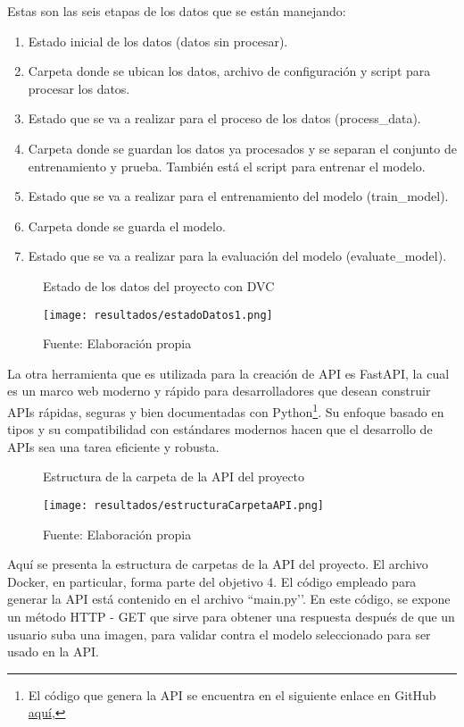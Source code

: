 Estas son las seis etapas de los datos que se están manejando:

\begin{enumerate}
	\item Estado inicial de los datos (datos sin procesar).
	\item Carpeta donde se ubican los datos, archivo de configuración y script para procesar los datos.
	\item Estado que se va a realizar para el proceso de los datos (process\_data).
	\item Carpeta donde se guardan los datos ya procesados y se separan el conjunto de entrenamiento y prueba. También está el script para entrenar el modelo.
	\item Estado que se va a realizar para el entrenamiento del modelo (train\_model).
	\item Carpeta donde se guarda el modelo.
	\item Estado que se va a realizar para la evaluación del modelo (evaluate\_model).
\end{enumerate}

\newpage

\begin{figure}[h]
\centering
\caption{Estado de los datos del proyecto con DVC}
\texttt{[image: resultados/estadoDatos1.png]}
\caption*{\footnotesize Fuente: Elaboración propia}
\label{fig:figuraEstadoDatos}
\end{figure}

\newpage

La otra herramienta que es utilizada para la creación de API es FastAPI, la cual es un marco web moderno y rápido para desarrolladores que desean construir APIs rápidas, seguras y bien documentadas con Python\footnote{El código que genera la API se encuentra en el siguiente enlace en GitHub \href{https://github.com/juferoto/mlops_project/tree/master/application/src}{aquí},}. Su enfoque basado en tipos y su compatibilidad con estándares modernos hacen que el desarrollo de APIs sea una tarea eficiente y robusta.

\begin{figure}[h]
\centering
\caption{Estructura de la carpeta de la API del proyecto}
\texttt{[image: resultados/estructuraCarpetaAPI.png]}
\caption*{\footnotesize Fuente: Elaboración propia}
\label{fig:figuraEstructuraCarpetaAPI}
\end{figure}

Aquí se presenta la estructura de carpetas de la API del proyecto. El archivo Docker, en particular, forma parte del objetivo 4. El código empleado para generar la API está contenido en el archivo ``main.py’’. En este código, se expone un método HTTP - GET que sirve para obtener una respuesta después de que un usuario suba una imagen, para validar contra el modelo seleccionado para ser usado en la API.


